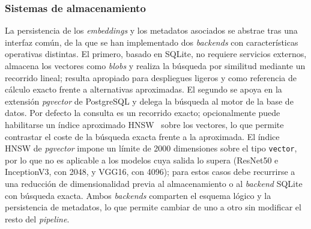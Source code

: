 \subsubsection{Sistemas de almacenamiento}
La persistencia de los \textit{embeddings} y los metadatos asociados se abstrae
tras una interfaz común, de la que se han implementado dos \textit{backends}
con características operativas distintas. El primero, basado en SQLite, no
requiere servicios externos, almacena los vectores como \textit{blobs} y
realiza la búsqueda por similitud mediante un recorrido lineal; resulta
apropiado para despliegues ligeros y como referencia de cálculo exacto frente a
alternativas aproximadas. El segundo se apoya en la extensión \textit{pgvector}
de PostgreSQL y delega la búsqueda al motor de la base de datos. Por defecto la
consulta es un recorrido exacto; opcionalmente puede habilitarse un índice
aproximado HNSW~\cite{malkov_efficient_2018} sobre los vectores, lo que permite
contrastar el coste de la búsqueda exacta frente a la aproximada. El índice
HNSW de \textit{pgvector} impone un límite de 2000 dimensiones sobre el tipo
\texttt{vector}, por lo que no es aplicable a los modelos cuya salida lo supera
(ResNet50 e InceptionV3, con 2048, y VGG16, con 4096); para estos casos debe
recurrirse a una reducción de dimensionalidad previa al almacenamiento o al
\textit{backend} SQLite con búsqueda exacta. Ambos \textit{backends} comparten
el esquema lógico y la persistencia de metadatos, lo que permite cambiar de uno
a otro sin modificar el resto del \textit{pipeline}.
